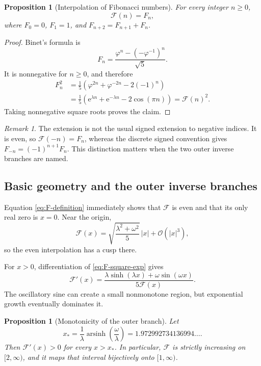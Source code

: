 \documentclass[11pt,oneside]{article}
\numberwithin{equation}{section}
\theoremstyle{plain}
\newtheorem{proposition}[theorem]{Proposition}
\theoremstyle{definition}
\theoremstyle{remark}
\newtheorem{remark}[theorem]{Remark}
\newcommand{\Fcal}{\mathcal{F}}
\newcommand{\e}{\mathrm e}
\newcommand{\Ord}{\mathcal O}
\DeclareMathOperator{\arsinh}{arsinh}
\begin{document}
\begin{proposition}[Interpolation of Fibonacci numbers]\label{prop:integer-interpolation}
For every integer \(n\ge0\),
\[
 \Fcal(n)=F_n,
\]
where \(F_0=0\), \(F_1=1\), and \(F_{n+2}=F_{n+1}+F_n\).
\end{proposition}

\begin{proof}
Binet's formula is
\[
 F_n=\frac{\varphi^n-(-\varphi^{-1})^n}{\sqrt5}.
\]
It is nonnegative for \(n\ge0\), and therefore
\begin{align*}
 F_n^2
 &=\frac15\left(\varphi^{2n}+\varphi^{-2n}-2(-1)^n\right)\\
 &=\frac15\left(\e^{\lambda n}+\e^{-\lambda n}
                  -2\cos(\pi n)\right)
 =\Fcal(n)^2.
\end{align*}
Taking nonnegative square roots proves the claim.
\end{proof}

\begin{remark}
The extension is not the usual signed extension to negative indices.  It is
even, so \(\Fcal(-n)=F_n\), whereas the discrete signed convention gives
\(F_{-n}=(-1)^{n+1}F_n\).  This distinction matters when the two outer
inverse branches are named.
\end{remark}

\subsection{Basic geometry and the outer inverse branches}

Equation \cref{eq:F-definition} immediately shows that \(\Fcal\) is even and
that its only real zero is \(x=0\).  Near the origin,
\begin{equation}\label{eq:F-origin}
 \Fcal(x)=\sqrt{\frac{\lambda^2+\omega^2}{5}}\,|x|
 +\Ord(|x|^3),
\end{equation}
so the even interpolation has a cusp there.

For \(x>0\), differentiation of \cref{eq:F-square-exp} gives
\begin{equation}\label{eq:F-derivative}
 \Fcal'(x)=
 \frac{\lambda\sinh(\lambda x)+\omega\sin(\omega x)}
      {5\Fcal(x)}.
\end{equation}
The oscillatory sine can create a small nonmonotone region, but exponential
growth eventually dominates it.

\begin{proposition}[Monotonicity of the outer branch]\label{prop:outer-monotone}
Let
\begin{equation}\label{eq:x-star}
 x_*=\frac1\lambda\arsinh\!\left(\frac\omega\lambda\right)
 =1.972992734136994\ldots.
\end{equation}
Then \(\Fcal'(x)>0\) for every \(x>x_*\).  In particular,
\(\Fcal\) is strictly increasing on \([2,\infty)\), and it maps that
interval bijectively onto \([1,\infty)\).
\end{proposition}
\end{document}
